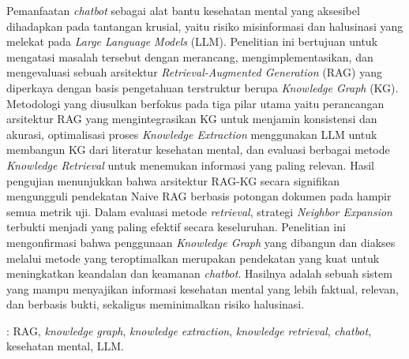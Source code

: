 Pemanfaatan \textit{chatbot} sebagai alat bantu kesehatan mental yang aksesibel dihadapkan pada tantangan krusial, yaitu risiko misinformasi dan halusinasi yang melekat pada \textit{Large Language Models} (LLM).
Penelitian ini bertujuan untuk mengatasi masalah tersebut dengan merancang, mengimplementasikan, dan mengevaluasi sebuah arsitektur \textit{Retrieval-Augmented Generation} (RAG) yang diperkaya dengan basis pengetahuan terstruktur berupa \textit{Knowledge Graph} (KG).
Metodologi yang diusulkan berfokus pada tiga pilar utama yaitu perancangan arsitektur RAG yang mengintegrasikan KG untuk menjamin konsistensi dan akurasi, optimalisasi proses \textit{Knowledge Extraction} menggunakan LLM untuk membangun KG dari literatur kesehatan mental, dan evaluasi berbagai metode \textit{Knowledge Retrieval} untuk menemukan informasi yang paling relevan.
Hasil pengujian menunjukkan bahwa arsitektur RAG-KG secara signifikan mengungguli pendekatan Naive RAG berbasis potongan dokumen pada hampir semua metrik uji.
Dalam evaluasi metode \textit{retrieval}, strategi \textit{Neighbor Expansion} terbukti menjadi yang paling efektif secara keseluruhan.
Penelitian ini mengonfirmasi bahwa penggunaan \textit{Knowledge Graph} yang dibangun dan diakses melalui metode yang teroptimalkan merupakan pendekatan yang kuat untuk meningkatkan keandalan dan keamanan \textit{chatbot}.
Hasilnya adalah sebuah sistem yang mampu menyajikan informasi kesehatan mental yang lebih faktual, relevan, dan berbasis bukti, sekaligus meminimalkan risiko halusinasi.

 : RAG, \textit{knowledge graph}, \textit{knowledge extraction}, \textit{knowledge retrieval}, \textit{chatbot}, kesehatan mental, LLM.




